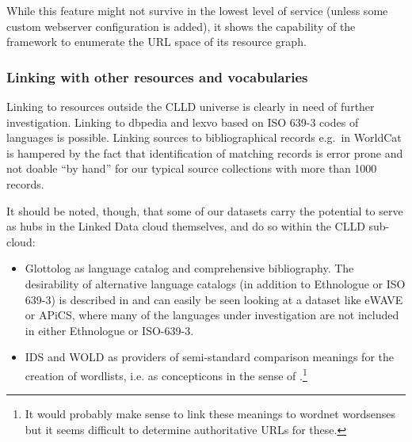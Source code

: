 \documentclass[a4paper,10pt]{article}
\begin{document}
%

While this feature might not survive in the lowest level of service (unless some custom
webserver configuration is added), it shows the capability of the framework to enumerate
the URL space of its resource graph.


\subsubsection{Linking with other resources and vocabularies}

Linking to resources outside the CLLD universe is clearly in need of further investigation.
Linking to dbpedia and lexvo based on ISO 639-3 codes of languages is possible.
Linking sources to bibliographical records e.g.~in WorldCat is hampered by the fact that
identification of matching records is error prone and not doable ``by hand'' for our typical
source collections with more than 1000 records.

It should be noted, though, that some of our datasets carry the potential to serve as hubs
in the Linked Data cloud themselves, and do so within the CLLD sub-cloud:
\begin{itemize}
\item Glottolog as language catalog and comprehensive bibliography. The desirability of
alternative language catalogs (in addition to Ethnologue or ISO 639-3) is described in
 and can easily be seen looking at a dataset like eWAVE or APiCS, where
many of the languages under investigation are not included in either Ethnologue or ISO-639-3.
\item IDS and WOLD as providers of semi-standard comparison meanings for the
creation of wordlists, i.e. as concepticons in the sense of .\footnote{It
would probably make sense to link these meanings to wordnet wordsenses but it seems difficult
to determine authoritative URLs for these.}
\end{itemize}
\end{document}
